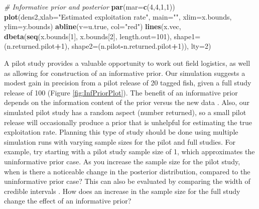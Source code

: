 \documentclass[
]{krantz}
\makeatletter
\newenvironment{Shaded}{\begin{snugshade}}{\end{snugshade}}
\newcommand{\AttributeTok}[1]{\textcolor[rgb]{0.27,0.27,0.27}{#1}}
\newcommand{\CommentTok}[1]{\textcolor[rgb]{0.37,0.37,0.37}{\textit{#1}}}
\newcommand{\DecValTok}[1]{\textcolor[rgb]{0.06,0.06,0.06}{#1}}
\newcommand{\FunctionTok}[1]{\textcolor[rgb]{0.27,0.27,0.27}{\textbf{#1}}}
\newcommand{\NormalTok}[1]{#1}
\newcommand{\SpecialCharTok}[1]{\textcolor[rgb]{0.43,0.43,0.43}{\textbf{#1}}}
\newcommand{\StringTok}[1]{\textcolor[rgb]{0.5,0.5,0.5}{#1}}
\newenvironment{kframe}{%
\medskip{}
\setlength{\fboxsep}{.8em}
 \def\at@end@of@kframe{}%
 \ifinner\ifhmode%
  \def\at@end@of@kframe{\end{minipage}}%
  \begin{minipage}{\columnwidth}%
 \fi\fi%
 \def\FrameCommand##1{\hskip\@totalleftmargin \hskip-\fboxsep
 \colorbox{shadecolor}{##1}\hskip-\fboxsep
     \hskip-\linewidth \hskip-\@totalleftmargin \hskip\columnwidth}%
 \MakeFramed {\advance\hsize-\width
   \@totalleftmargin\z@ \linewidth\hsize
   \@setminipage}}%
 {\par\unskip\endMakeFramed%
 \at@end@of@kframe}
\renewenvironment{Shaded}{\begin{kframe}}{\end{kframe}}
\makeatother
\begin{document}
\begin{Shaded}
\begin{Highlighting}[]
\CommentTok{\# Informative prior and posterior}
\FunctionTok{par}\NormalTok{(}\AttributeTok{mar=}\FunctionTok{c}\NormalTok{(}\DecValTok{4}\NormalTok{,}\DecValTok{4}\NormalTok{,}\DecValTok{1}\NormalTok{,}\DecValTok{1}\NormalTok{))}
\FunctionTok{plot}\NormalTok{(dens2,}\AttributeTok{xlab=}\StringTok{"Estimated exploitation rate"}\NormalTok{, }\AttributeTok{main=}\StringTok{""}\NormalTok{, }
     \AttributeTok{xlim=}\NormalTok{x.bounds, }\AttributeTok{ylim=}\NormalTok{y.bounds)}
\FunctionTok{abline}\NormalTok{(}\AttributeTok{v=}\NormalTok{u.true, }\AttributeTok{col=}\StringTok{"red"}\NormalTok{)}
\FunctionTok{lines}\NormalTok{(x.vec, }\FunctionTok{dbeta}\NormalTok{(}\FunctionTok{seq}\NormalTok{(x.bounds[}\DecValTok{1}\NormalTok{], x.bounds[}\DecValTok{2}\NormalTok{], }
                    \AttributeTok{length.out=}\DecValTok{101}\NormalTok{), }\AttributeTok{shape1=}\NormalTok{(n.returned.pilot}\SpecialCharTok{+}\DecValTok{1}\NormalTok{), }
                    \AttributeTok{shape2=}\NormalTok{(n.pilot}\SpecialCharTok{{-}}\NormalTok{n.returned.pilot}\SpecialCharTok{+}\DecValTok{1}\NormalTok{)), }\AttributeTok{lty=}\DecValTok{2}\NormalTok{)}
\end{Highlighting}
\end{Shaded}

A pilot study provides a valuable opportunity to work out field logistics, as well as allowing for construction of an informative prior. Our simulation suggests a modest gain in precision from a pilot release of 20 tagged fish, given a full study release of 100 (Figure \ref{fig:InfPriorPlot}). The benefit of an informative prior depends on the information content of the prior versus the new data \citep{mccarthy.masters_2005}. Also, our simulated pilot study has a random aspect (number returned), so a small pilot release will occasionally produce a prior that is unhelpful for estimating the true exploitation rate. Planning this type of study should be done using multiple simulation runs with varying sample sizes for the pilot and full studies. For example, try starting with a pilot study sample size of 1, which approximates the uninformative prior case. As you increase the sample size for the pilot study, when is there a noticeable change in the posterior distribution, compared to the uninformative prior case? This can also be evaluated by comparing the width of credible intervals \citep{mccarthy.masters_2005}. How does an increase in the sample size for the full study change the effect of an informative prior?
\end{document}
